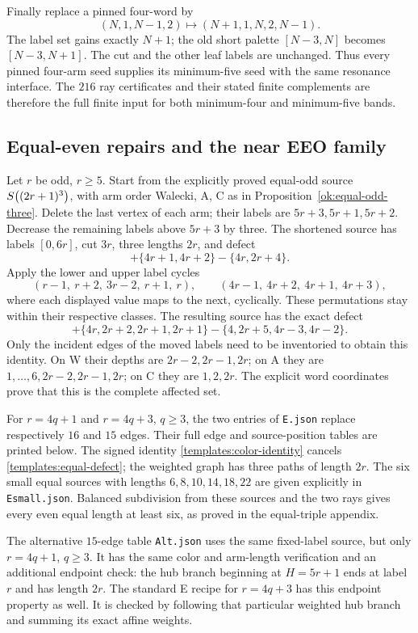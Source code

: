 Finally replace a pinned four-word by
\[
 (N,1,N-1,2)\longmapsto(N+1,1,N,2,N-1).
\]
The label set gains exactly $N+1$; the old short palette
$[N-3,N]$ becomes $[N-3,N+1]$.  The cut and the other leaf labels
are unchanged.  Thus every pinned four-arm seed supplies its
minimum-five seed with the same resonance interface.  The $216$
ray certificates and their stated finite complements are therefore
the full finite input for both minimum-four and minimum-five bands.

\subsection{Equal-even repairs and the near EEO family}
\label{templates:equal-even}

Let $r$ be odd, $r\ge5$.  Start from the explicitly proved equal-odd
source $S\!\left((2r+1)^3\right)$, with arm order Walecki, A, C as in
Proposition~\ref{ok:equal-odd-three}.  Delete the last vertex of each arm;
their labels are $5r+3,5r+1,5r+2$.  Decrease the remaining labels
above $5r+3$ by three.  The shortened source has labels $[0,6r]$,
cut $3r$, three lengths $2r$, and defect
\[
 +\{4r+1,4r+2\}-\{4r,2r+4\}.
\]
Apply the lower and upper label cycles
\[
 (r-1,\ r+2,\ 3r-2,\ r+1,\ r),\qquad
 (4r-1,\ 4r+2,\ 4r+1,\ 4r+3),
\]
where each displayed value maps to the next, cyclically.  These
permutations stay within their respective classes.  The resulting
source has the exact defect
\begin{equation}\label{templates:equal-defect}
 +\{4r,2r+2,2r+1,2r+1\}
 -\{4,2r+5,4r-3,4r-2\}.
\end{equation}
Only the incident edges of the moved labels need to be inventoried
to obtain this identity.  On W their depths are $2r-2,2r-1,2r$;
on A they are $1,\ldots,6,2r-2,2r-1,2r$; on C they are
$1,2,2r$.  The explicit word coordinates prove that this is the
complete affected set.

For $r=4q+1$ and $r=4q+3$, $q\ge3$, the two entries of
\texttt{E.json} replace respectively $16$ and $15$ edges.  Their
full edge and source-position tables are printed below.  The signed
identity \eqref{templates:color-identity} cancels
\eqref{templates:equal-defect}; the weighted graph has three paths
of length $2r$.  The six small equal sources with lengths
$6,8,10,14,18,22$ are given explicitly in \texttt{Esmall.json}.
Balanced subdivision from these sources and the two rays gives
every even equal length at least six, as proved in the equal-triple
appendix.

The alternative $15$-edge table \texttt{Alt.json} uses the same
fixed-label source, but only $r=4q+1$, $q\ge3$.  It has the same
color and arm-length verification and an additional endpoint check:
the hub branch beginning at $H=5r+1$ ends at label $r$ and has
length $2r$.  The standard E recipe for $r=4q+3$ has this endpoint
property as well.  It is checked by following that particular
weighted hub branch and summing its exact affine weights.

